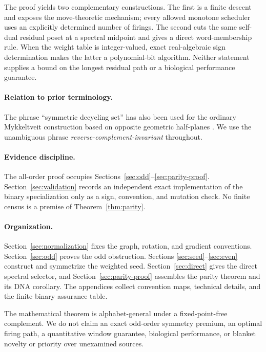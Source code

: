 The proof yields two complementary constructions.  The first is a finite
descent and exposes the move-theoretic mechanism; every allowed monotone
scheduler uses an explicitly determined number of firings.  The second cuts
the same self-dual residual poset at a spectral midpoint and gives a direct
word-membership rule.  When the weight table is integer-valued, exact
real-algebraic sign determination makes the latter a polynomial-bit
algorithm.  Neither statement supplies a bound on
the longest residual path or a biological performance guarantee.

\paragraph{Relation to prior terminology.}
The phrase ``symmetric decycling set'' has also been used for the ordinary
Mykkeltveit construction based on opposite geometric half-planes
\cite{PellowEtAl2023}.  We use the unambiguous phrase
\emph{reverse-complement-invariant} throughout.

\paragraph{Evidence discipline.}
The all-order proof occupies Sections~\ref{sec:odd}--\ref{sec:parity-proof}.
Section~\ref{sec:validation} records an independent exact implementation of
the binary specialization only as a sign, convention, and mutation check.
No finite census is a premise of Theorem~\ref{thm:parity}.

\paragraph{Organization.}
Section~\ref{sec:normalization} fixes the graph, rotation, and gradient
conventions.  Section~\ref{sec:odd} proves the odd obstruction.  Sections
\ref{sec:seed}--\ref{sec:even} construct and symmetrize the weighted seed.
Section~\ref{sec:direct} gives the direct spectral selector, and
Section~\ref{sec:parity-proof} assembles the parity theorem and its DNA
corollary.  The appendices collect convention maps, technical details, and
the finite binary assurance table.

\begin{boundary}
The mathematical theorem is alphabet-general under a fixed-point-free
complement.  We do not claim an exact odd-order symmetry premium, an optimal
firing path, a quantitative window guarantee, biological performance, or
blanket novelty or priority over unexamined sources.
\end{boundary}
